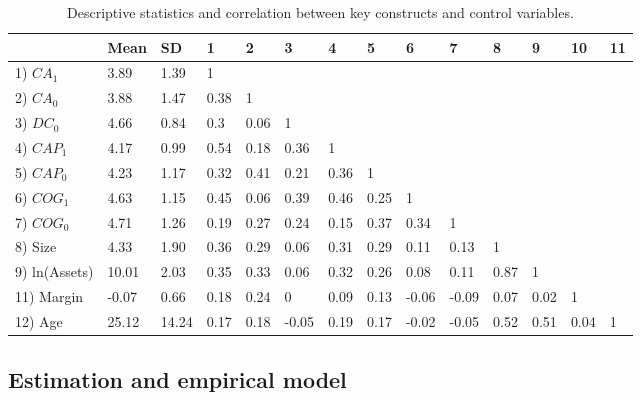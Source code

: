 \documentclass[review,fleqn]{elsarticle}\usepackage[]{graphicx}\usepackage[]{color}
\begin{document}
\begin{table}[t]
  \caption{Descriptive statistics and correlation between key constructs and control
  variables.}
\label{tab:cor}

\singlespacing
\tiny
\setlength{\tabcolsep}{3pt}
\begingroup\scriptsize
\begin{tabular}{lp{0.290in}p{0.290in}p{0.290in}p{0.290in}p{0.290in}p{0.290in}p{0.290in}p{0.290in}p{0.290in}p{0.290in}p{0.290in}p{0.290in}p{0.290in}}
  \hline
 & Mean & SD & 1 & 2 & 3 & 4 & 5 & 6 & 7 & 8 & 9 & 10 & 11 \\ 
  \hline
1) $CA_1$ & 3.89 & 1.39 & 1 &  &  &  &  &  &  &  &  &  &  \\ 
  2) $CA_0$ & 3.88 & 1.47 & 0.38 & 1 &  &  &  &  &  &  &  &  &  \\ 
  3) $DC_0$ & 4.66 & 0.84 & 0.3 & 0.06 & 1 &  &  &  &  &  &  &  &  \\ 
  4) $CAP_1$ & 4.17 & 0.99 & 0.54 & 0.18 & 0.36 & 1 &  &  &  &  &  &  &  \\ 
  5) $CAP_0$ & 4.23 & 1.17 & 0.32 & 0.41 & 0.21 & 0.36 & 1 &  &  &  &  &  &  \\ 
  6) $COG_1$ & 4.63 & 1.15 & 0.45 & 0.06 & 0.39 & 0.46 & 0.25 & 1 &  &  &  &  &  \\ 
  7) $COG_0$ & 4.71 & 1.26 & 0.19 & 0.27 & 0.24 & 0.15 & 0.37 & 0.34 & 1 &  &  &  &  \\ 
  8) Size & 4.33 & 1.90 & 0.36 & 0.29 & 0.06 & 0.31 & 0.29 & 0.11 & 0.13 & 1 &  &  &  \\ 
  9) ln(Assets) & 10.01 & 2.03 & 0.35 & 0.33 & 0.06 & 0.32 & 0.26 & 0.08 & 0.11 & 0.87 & 1 &  &  \\ 
  11) Margin & -0.07 & 0.66 & 0.18 & 0.24 & 0 & 0.09 & 0.13 & -0.06 & -0.09 & 0.07 & 0.02 & 1 &  \\ 
  12) Age & 25.12 & 14.24 & 0.17 & 0.18 & -0.05 & 0.19 & 0.17 & -0.02 & -0.05 & 0.52 & 0.51 & 0.04 & 1 \\ 
   \hline
\end{tabular}
\endgroup



\end{table}

\subsection*{Estimation and empirical model}
\end{document}
